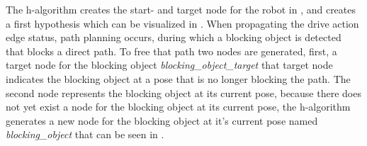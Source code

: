 The \ac{h-algorithm} creates the start- and target node for the robot in , and creates a first hypothesis which can be visualized in . When propagating the drive action edge status, path planning occurs, during which a blocking object is detected that blocks a direct path. To free that path two nodes are generated, first, a target node for the blocking object \textit{blocking\_object\_target} that target node indicates the blocking object at a pose that is no longer blocking the path. The second node represents the blocking object at its current pose, because there does not yet exist a node for the blocking object at its current pose, the \ac{h-algorithm} generates a new node for the blocking object at it's current pose named \textit{blocking\_object} that can be seen in .\bs

